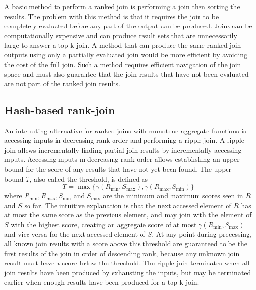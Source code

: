 A basic method to perform a ranked join is performing a join then sorting the results. The problem with this method is that it requires the join to be completely evaluated before any part of the output can be produced. Joins can be computationally expensive and can produce result sets that are unnecessarily large to answer a top-k join. A method that can produce the same ranked join outputs using only a partially evaluated join would be more efficient by avoiding the cost of the full join. Such a method requires efficient navigation of the join space and must also guarantee that the join results that have not been evaluated are not part of the ranked join results.

\subsection{Hash-based rank-join}


An interesting alternative for ranked joins with monotone aggregate functions is accessing inputs in decreasing rank order and performing a ripple join. A ripple join allows incrementally finding partial join results by incrementally accessing inputs. Accessing inputs in decreasing rank order allows establishing an upper bound for the score of any results that have not yet been found. The upper bound \(T\), also called the threshold, is defined as
\[
  T = \max\{\gamma(R_{\min}, S_{\max}), \gamma(R_{\max}, S_{\min})\}
\]
where \(R_{\min}, R_{\max}, S_{\min}\) and \(S_{\max}\) are the minimum and maximum scores seen in \(R\) and \(S\) so far.
The intuitive explanation is that the next accessed element of \(R\) has at most the same score as the previous element, and may join with the element of \(S\) with the highest score, creating an aggregate score of at most \(\gamma(R_{\min}, S_{\max})\) and vice versa for the next accessed element of \(S\). At any point during processing, all known join results with a score above this threshold are guaranteed to be the first results of the join in order of descending rank, because any unknown join result must have a score below the threshold. The ripple join terminates when all join results have been produced by exhausting the inputs, but may be terminated earlier when enough results have been produced for a top-k join.

